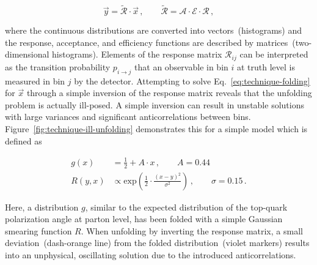 \begin{equation}
\vec{y} = \widetilde{\mathcal{R}}\cdot\vec{x}\,,\qquad \widetilde{\mathcal{R}}=\mathcal{A}\cdot\mathcal{E}\cdot\mathcal{R}\,, \label{eq:technique-folding}
\end{equation}

where the continuous distributions are converted into vectors~(histograms) and the response, acceptance, and efficiency functions are described by matrices~(two-dimensional histograms). Elements of the response matrix $\mathcal{R}_{ij}$ can be interpreted as the transition probability $p_{i\to j}$ that an observable in bin $i$ at truth level is measured in bin $j$ by the detector. Attempting to solve Eq.~\ref{eq:technique-folding} for $\vec{x}$ through a simple inversion of the response matrix reveals that the unfolding problem is actually ill-posed. A simple inversion can result in unstable solutions with large variances and significant anticorrelations between bins. Figure~\ref{fig:technique-ill-unfolding} demonstrates this for a simple model which is defined as

\begin{subequations}\label{eq:technique-unfolding-test-model}
\begin{align}
g(x)&=\frac{1}{2}+A\cdot x\,,\qquad A=0.44\\
R(y,x)&\propto\mathrm{exp}\left(\frac{1}{2}\cdot\frac{(x-y)^2}{\sigma^2}\right)\,,\qquad \sigma=0.15\,.
\end{align}
\end{subequations}

Here, a distribution $g$, similar to the expected distribution of the top-quark polarization angle at parton level, has been folded with a simple Gaussian smearing function $R$. When unfolding by inverting the response matrix, a small deviation~(dash-orange line) from the folded distribution~(violet markers) results into an unphysical, oscillating solution due to the introduced anticorrelations.

